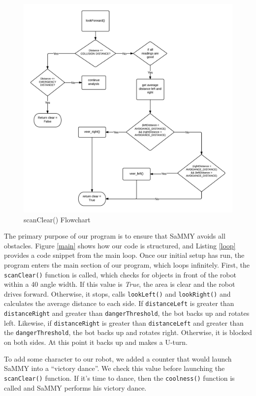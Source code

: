 \documentclass[11pt]{article}
\begin{document}
	\begin{figure}[h]\centering
	\includegraphics[height=0.85\textwidth]{images/scan_clear.png}
	\caption{scanClear() Flowchart}
		\label{scan}
	\end{figure}
	
\par\noindent
The primary purpose of our program is to ensure that SaMMY avoids all obstacles. Figure \ref{main} shows how our code is structured, and Listing \ref{loop} provides a code snippet from the main loop.  Once our initial setup has run, the program enters the main section of our program, which loops infinitely. First, the \texttt{scanClear()} function is called, which checks for objects in front of the robot within a 40\degree \hspace{1pt} angle width. If this value is \emph{True}, the area is clear and the robot drives forward. Otherwise, it stops, calls \texttt{lookLeft()} and \texttt{lookRight()} and calculates the average distance to each side. If \texttt{distanceLeft} is greater than \texttt{distanceRight} and greater than \texttt{dangerThreshold}, the bot backs up and rotates left. Likewise, if \texttt{distanceRight} is greater than \texttt{distanceLeft} and greater than the \texttt{dangerThreshold}, the bot backs up and rotates right. Otherwise, it is blocked on both sides. At this point it backs up and makes a U-turn.


To add some character to our robot, we added a counter that would launch SaMMY into a ``victory dance''.  We check this value before launching the \texttt{scanClear()} function.  If it's time to dance, then the \texttt{coolness()} function is called and SaMMY performs his victory dance.
\end{document}

